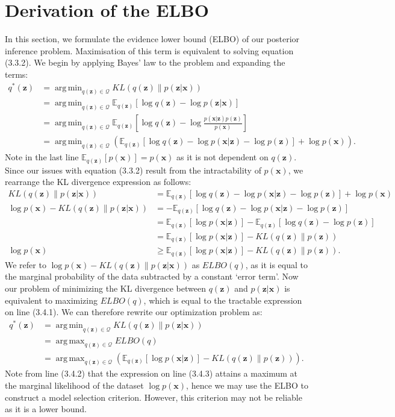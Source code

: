 \documentclass[honours,12pt]{unswthesis}
\DeclareMathOperator*{\argmin}{arg\,min}
\DeclareMathOperator*{\argmax}{arg\,max}
\numberwithin{equation}{section}
\theoremstyle{definition}
\begin{document}
\section{Derivation of the ELBO}
In this section, we formulate the evidence lower bound (ELBO) of our posterior inference problem. Maximisation of this term is equivalent to solving equation (3.3.2). We begin by applying Bayes' law to the problem and expanding the terms:
\begin{align*}
q^*(\bm{z})&=\argmin_{q(\bm{z})\in \mathcal{Q}}KL(q(\bm{z})\|p(\bm{z}|\bm{x}))\\
&= \argmin_{q(\bm{z})\in \mathcal{Q}} \mathbb{E}_{q(\bm{z})}[\log q(\bm{z})-\log p(\bm{z}|\bm{x})]\\
&= \argmin_{q(\bm{z})\in \mathcal{Q}} \mathbb{E}_{q(\bm{z})}\left[\log q(\bm{z})-\log\frac{p(\bm{x}|\bm{z})p(\bm{z})}{p(\bm{x})}\right]\\
&= \argmin_{q(\bm{z})\in \mathcal{Q}} \left(\mathbb{E}_{q(\bm{z})}[\log q(\bm{z})-\log p(\bm{x}|\bm{z})-\log p(\bm{z})]+\log p(\bm{x})\right).
\end{align*}
Note in the last line $\mathbb{E}_{q(\bm{z})}[p(\bm{x})]=p(\bm{x})$ as it is not dependent on $q(\bm{z})$. Since our issues with equation (3.3.2) result from the intractability of $p(\bm{x})$, we rearrange the KL divergence expression as follows:
\begin{align}
KL(q(\bm{z})\|p(\bm{z}|\bm{x}))&=\mathbb{E}_{q(\bm{z})}[\log q(\bm{z})-\log p(\bm{x}|\bm{z})-\log p(\bm{z})]+\log p(\bm{x}) \nonumber \\
\log p(\bm{x})-KL(q(\bm{z})\|p(\bm{z}|\bm{x}))&=-\mathbb{E}_{q(\bm{z})}[\log q(\bm{z})-\log p(\bm{x}|\bm{z})-\log p(\bm{z})]\nonumber \\
&=\mathbb{E}_{q(\bm{z})}[\log p(\bm{x}|\bm{z})]-\mathbb{E}_{q(\bm{z})}[\log q(\bm{z})-\log p(\bm{z})]\nonumber \\
&=\mathbb{E}_{q(\bm{z})}[\log p(\bm{x}|\bm{z})]-KL(q(\bm{z})\|p(\bm{z}))\\
\log p(\bm{x})&\geq \mathbb{E}_{q(\bm{z})}[\log p(\bm{x}|\bm{z})]-KL(q(\bm{z})\|p(\bm{z})).
\end{align}
We refer to $\log p(\bm{x})-KL(q(\bm{z})\|p(\bm{z}|\bm{x}))$ as $ELBO(q)$, as it is equal to the marginal probability of the data subtracted by a constant `error term'. Now our problem of minimizing the KL divergence between $q(\bm{z})$ and $p(\bm{z}|\bm{x})$ is equivalent to maximizing $ELBO(q)$, which is equal to the tractable expression on line (3.4.1). We can therefore rewrite our optimization problem as:
\begin{align}
q^*(\bm{z})&=\argmin_{q(\bm{z})\in \mathcal{Q}}KL(q(\bm{z})\|p(\bm{z}|\textbf{x}))\nonumber\\
&= \argmax_{q(\bm{z})\in \mathcal{Q}} ELBO(q)\nonumber\\
&= \argmax_{q(\bm{z})\in \mathcal{Q}} \left(\mathbb{E}_{q(\bm{z})}[\log p(\bm{x}|\bm{z})]-KL(q(\bm{z})\|p(\bm{z}))\right).
\end{align}
Note from line (3.4.2) that the expression on line (3.4.3) attains a maximum at the marginal likelihood of the dataset $\log p(\bm{x})$, hence we may use the ELBO to construct a model selection criterion\citep{pattern}. However, this criterion may not be reliable as it is a lower bound.
\newpage
\end{document}
